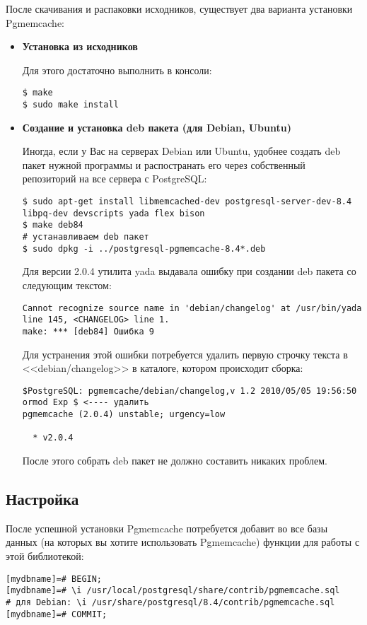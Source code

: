 После скачивания и распаковки исходников, существует два варианта установки Pgmemcache:
\begin{itemize}
\item \textbf{Установка из исходников}

Для этого достаточно выполнить в консоли:
\begin{lstlisting}[label=lst:pgcache1,caption=Установка из исходников]
$ make
$ sudo make install
\end{lstlisting}
\item \textbf{Создание и установка deb пакета (для Debian, Ubuntu)}

Иногда, если у Вас на серверах Debian или Ubuntu, удобнее создать deb пакет нужной программы и 
распостранать его через собственный репозиторий на все сервера с PostgreSQL:
\begin{lstlisting}[label=lst:pgcache2,caption=Создание и установка deb пакета]
$ sudo apt-get install libmemcached-dev postgresql-server-dev-8.4 libpq-dev devscripts yada flex bison
$ make deb84
# устанавливаем deb пакет
$ sudo dpkg -i ../postgresql-pgmemcache-8.4*.deb
\end{lstlisting}

Для версии 2.0.4 утилита yada выдавала ошибку при создании deb пакета со следующим текстом:
\begin{lstlisting}[label=lst:pgcache3,caption=Создание и установка deb пакета]
Cannot recognize source name in 'debian/changelog' at /usr/bin/yada line 145, <CHANGELOG> line 1.
make: *** [deb84] Ошибка 9
\end{lstlisting}

Для устранения этой ошибки потребуется удалить первую строчку текста в <<debian/changelog>> в каталоге, котором происходит сборка:
\begin{lstlisting}[label=lst:pgcache4,caption=Создание и установка deb пакета]
$PostgreSQL: pgmemcache/debian/changelog,v 1.2 2010/05/05 19:56:50 ormod Exp $ <---- удалить
pgmemcache (2.0.4) unstable; urgency=low

  * v2.0.4
\end{lstlisting}

После этого собрать deb пакет не должно составить никаких проблем.
\end{itemize}


\subsection{Настройка}
После успешной установки Pgmemcache потребуется добавит во все базы данных (на которых вы хотите использовать Pgmemcache) 
функции для работы с этой библиотекой:
\begin{lstlisting}[label=lst:pgcache5,caption=Настройка]
% psql [mydbname] [pguser]
[mydbname]=# BEGIN;
[mydbname]=# \i /usr/local/postgresql/share/contrib/pgmemcache.sql
# для Debian: \i /usr/share/postgresql/8.4/contrib/pgmemcache.sql
[mydbname]=# COMMIT;
\end{lstlisting}

